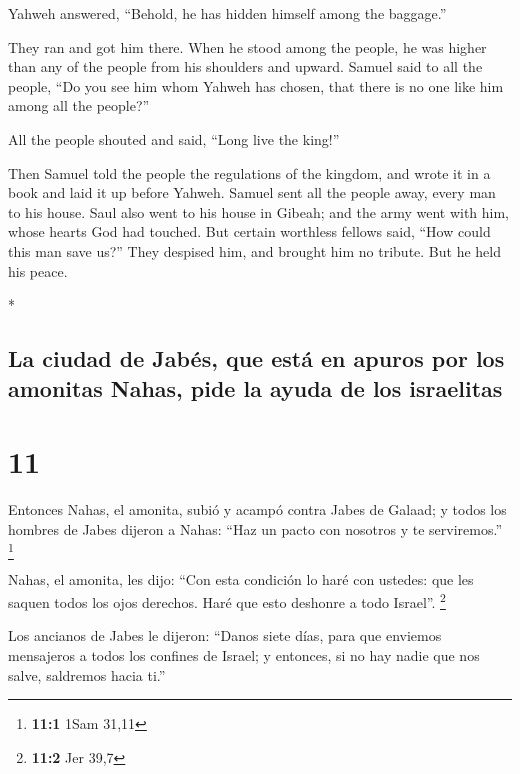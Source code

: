 \begin{paracol}{2}
\begin{otherlanguage}{english}
Yahweh answered, ``Behold, he has hidden himself among the baggage.''

 They ran and got him there. When he stood among the
people, he was higher than any of the people from his shoulders and
upward.  Samuel said to all the people, ``Do you see him
whom Yahweh has chosen, that there is no one like him among all the
people?''

All the people shouted and said, ``Long live the king!''

 Then Samuel told the people the regulations of the
kingdom, and wrote it in a book and laid it up before Yahweh. Samuel
sent all the people away, every man to his house.  Saul
also went to his house in Gibeah; and the army went with him, whose
hearts God had touched.  But certain worthless fellows
said, ``How could this man save us?'' They despised him, and brought him
no tribute. But he held his peace.

\end{otherlanguage}

\switchcolumn[0]*

\hypertarget{la-ciudad-de-jabuxe9s-que-estuxe1-en-apuros-por-los-amonitas-nahas-pide-la-ayuda-de-los-israelitas}{%
\subsection{La ciudad de Jabés, que está en apuros por los amonitas
Nahas, pide la ayuda de los
israelitas}\label{la-ciudad-de-jabuxe9s-que-estuxe1-en-apuros-por-los-amonitas-nahas-pide-la-ayuda-de-los-israelitas}}

\hypertarget{section-20}{%
\section{11}\label{section-20}}

 Entonces Nahas, el amonita, subió y acampó contra Jabes
de Galaad; y todos los hombres de Jabes dijeron a Nahas: ``Haz un pacto
con nosotros y te serviremos.'' \footnote{\textbf{11:1} 1Sam 31,11}

 Nahas, el amonita, les dijo: ``Con esta condición lo haré
con ustedes: que les saquen todos los ojos derechos. Haré que esto
deshonre a todo Israel''. \footnote{\textbf{11:2} Jer 39,7}

 Los ancianos de Jabes le dijeron: ``Danos siete días,
para que enviemos mensajeros a todos los confines de Israel; y entonces,
si no hay nadie que nos salve, saldremos hacia ti.''


\end{paracol}
